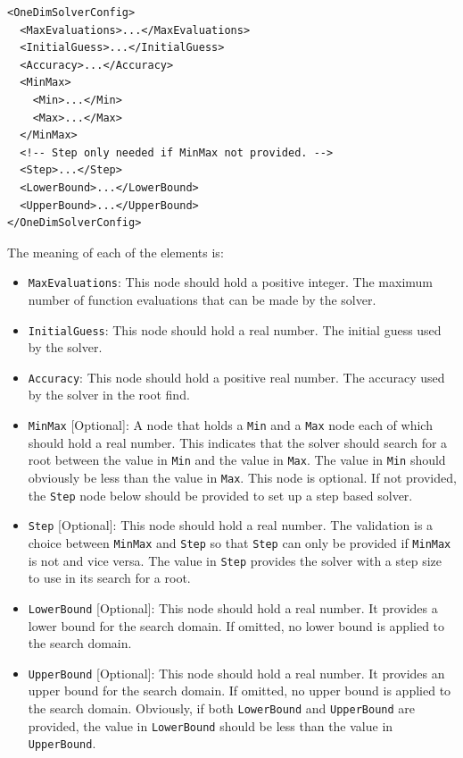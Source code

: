 \begin{longlisting}
\begin{verbatim}
<OneDimSolverConfig>
  <MaxEvaluations>...</MaxEvaluations>
  <InitialGuess>...</InitialGuess>
  <Accuracy>...</Accuracy>
  <MinMax>
    <Min>...</Min>
    <Max>...</Max>
  </MinMax>
  <!-- Step only needed if MinMax not provided. -->
  <Step>...</Step>
  <LowerBound>...</LowerBound>
  <UpperBound>...</UpperBound>
</OneDimSolverConfig>
\end{verbatim}
\caption{\lstinline!OneDimSolverConfig! node outline}
\label{lst:one_dim_solver_config_outline}
\end{longlisting}

The meaning of each of the elements is:
\begin{itemize}
\item \lstinline!MaxEvaluations!:
This node should hold a positive integer. The maximum number of function evaluations that can be made by the solver.

\item \lstinline!InitialGuess!:
This node should hold a real number. The initial guess used by the solver.

\item \lstinline!Accuracy!:
This node should hold a positive real number. The accuracy used by the solver in the root find.

\item \lstinline!MinMax! [Optional]:
A node that holds a \lstinline!Min! and a \lstinline!Max! node each of which should hold a real number. This indicates that the solver should search for a root between the value in \lstinline!Min! and the value in \lstinline!Max!. The value in \lstinline!Min! should obviously be less than the value in \lstinline!Max!. This node is optional. If not provided, the \lstinline!Step! node below should be provided to set up a step based solver.

\item \lstinline!Step! [Optional]:
This node should hold a real number. The validation is a choice between \lstinline!MinMax! and \lstinline!Step! so that \lstinline!Step! can only be provided if \lstinline!MinMax! is not and vice versa. The value in \lstinline!Step! provides the solver with a step size to use in its search for a root.

\item \lstinline!LowerBound! [Optional]:
This node should hold a real number. It provides a lower bound for the search domain. If omitted, no lower bound is applied to the search domain.

\item \lstinline!UpperBound! [Optional]:
This node should hold a real number. It provides an upper bound for the search domain. If omitted, no upper bound is applied to the search domain. Obviously, if both \lstinline!LowerBound! and \lstinline!UpperBound! are provided, the value in \lstinline!LowerBound! should be less than the value in \lstinline!UpperBound!.

\end{itemize}
